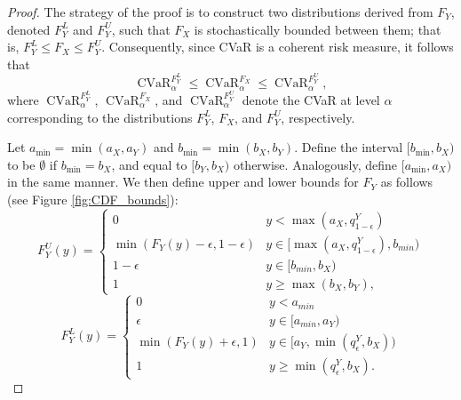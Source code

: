 \documentclass[acmlarge, manuscript, screen, review, natbib=false, oneside]{acmart}
\DeclareMathOperator{\CVaR}{CVaR}
\begin{document}
\begin{proof}
	The strategy of the proof is to construct two distributions derived from $F_Y$, denoted $F_Y^L$ and $F_Y^U$, such that $F_X$ is stochastically bounded between them; that is, $F_Y^L \leq F_X \leq F_Y^U$. Consequently, since CVaR is a coherent risk measure, it follows that
	\begin{equation}
		\CVaR_\alpha^{F_Y^L} \leq \CVaR_\alpha^{F_X} \leq \CVaR_\alpha^{F_Y^U},
	\end{equation}
	where $\CVaR_\alpha^{F_Y^L}$, $\CVaR_\alpha^{F_X}$, and $\CVaR_\alpha^{F_Y^U}$ denote the CVaR at level $\alpha$ corresponding to the distributions $F_Y^L$, $F_X$, and $F_Y^U$, respectively.
	
	Let $a_{\min} = \min(a_X, a_Y)$ and $b_{\min} = \min(b_X, b_Y)$. Define the interval $[b_{\min}, b_X)$ to be $\emptyset$ if $b_{\min} = b_X$, and equal to $[b_Y, b_X)$ otherwise. Analogously, define $[a_{\min}, a_X)$ in the same manner. We then define upper and lower bounds for $F_Y$ as follows (see Figure \ref{fig:CDF_bounds}): \begin{equation}
		F_Y^U(y)=\begin{cases}
			0 & y< \max(a_X,q_{1-\epsilon}^Y) \\
			\min(F_Y(y)-\epsilon, 1-\epsilon) & y\in [\max(a_X,q_{1-\epsilon}^Y), b_{min}) \\
			1-\epsilon & y\in [b_{min}, b_X) \\
			1 & y\geq \max(b_X, b_Y),
		\end{cases}
	\end{equation}
	\begin{equation}
		F_Y^L(y)=\begin{cases}
			0 & y<a_{min}  \\
			\epsilon & y\in [a_{min}, a_Y) \\
			\min(F_Y(y)+\epsilon, 1) & y\in [a_Y, \min(q_{\epsilon}^Y, b_X)) \\
			1 & y\geq \min(q_\epsilon^Y, b_X).
		\end{cases}
	\end{equation}


\end{proof}
\end{document}
